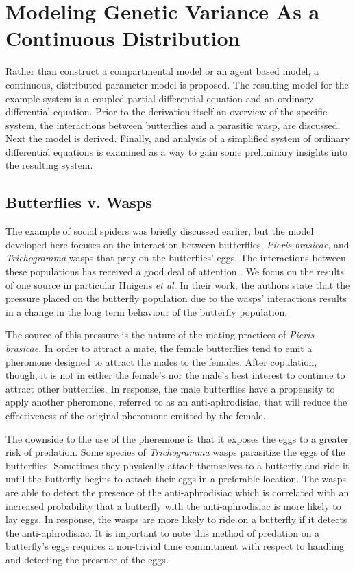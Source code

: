\documentclass[12pt]{article}
\begin{document}
\section{Modeling Genetic Variance As a Continuous Distribution}

Rather than construct a compartmental model or an agent based model, a
continuous, distributed parameter model is proposed. The resulting
model for the example system is a coupled partial differential
equation and an ordinary differential equation. Prior to the
derivation itself an overview of the specific system, the interactions
between butterflies and a parasitic wasp, are discussed. Next the
model is derived. Finally, and analysis of a simplified system of
ordinary differential equations is examined as a way to gain some
preliminary insights into the resulting system.

\subsection{Butterflies v. Wasps}
\label{butterflyVWasps}

The example of social spiders was briefly discussed earlier, but the
model developed here focuses on the interaction between butterflies,
\textit{Pieris brasicae}, and \textit{Trichogramma} wasps that prey on
the butterflies' eggs. The interactions between these populations has
received a good deal of attention
\cite{PMC2797620,doi:10.1111/j.1439-0418.1986.tb00834.x,Figueroa2010AttractionOT,10.3389/fpls.2019.01768}. We
focus on the results of one source in particular Huigens \textit{et
  al}\cite{10.1093/beheco/arq007}. In their work, the authors state
that the pressure placed on the butterfly population due to the wasps'
interactions results in a change in the long term behaviour of the
butterfly population.

The source of this pressure is the nature of the mating practices of
\textit{Pieris brasicae}. In order to attract a mate, the female
butterflies tend to emit a pheromone designed to attract the males to
the females. After copulation, though, it is not in either the
female's nor the male's best interest to continue to attract other
butterflies. In response, the male butterflies have a propensity to
apply another pheromone, referred to as an anti-aphrodisiac, that will
reduce the effectiveness of the original pheromone emitted by the
female.

The downside to the use of the pheremone is that it exposes the eggs
to a greater risk of predation. Some species of \textit{Trichogramma}
wasps parasitize the eggs of the butterflies. Sometimes they
physically attach themselves to a butterfly and ride it until the
butterfly begins to attach their eggs in a preferable location. The
wasps are able to detect the presence of the anti-aphrodisiac which is
correlated with an increased probability that a butterfly with the
anti-aphrodisiac is more likely to lay eggs. In response, the wasps
are more likely to ride on a butterfly if it detects the
anti-aphrodisiac. It is important to note this method of predation on
a butterfly's eggs requires a non-trivial time commitment with respect
to handling and detecting the presence of the eggs.
\end{document}
